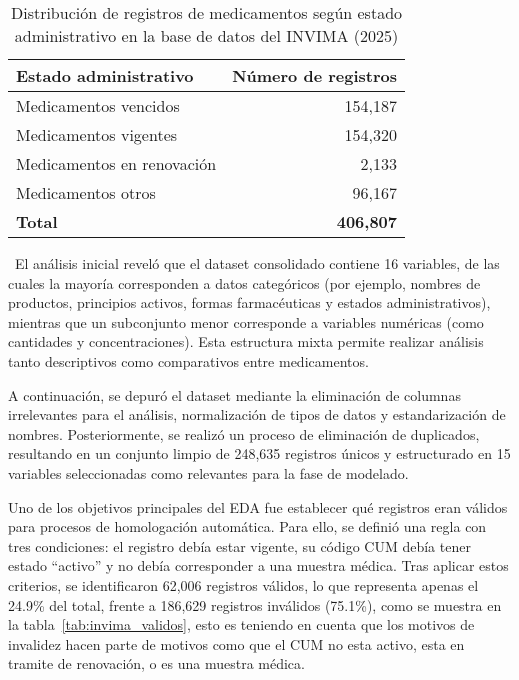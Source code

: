 \documentclass[conference]{IEEEtran}
\begin{document}
\begin{table}[htbp]
\caption{Distribución de registros de medicamentos según estado administrativo en la base de datos del INVIMA (2025) \cite{invima2025}}
\begin{center}
\begin{tabular}{|l|r|}
\hline
\textbf{Estado administrativo} & \textbf{Número de registros} \\
\hline
Medicamentos vencidos         & 154,187 \\
Medicamentos vigentes         & 154,320 \\
Medicamentos en renovación    & 2,133   \\
Medicamentos otros            & 96,167  \\
\hline
\textbf{Total} & \textbf{406,807} \\
\hline
\end{tabular}
\label{tab:invima_estados}
\end{center}
\end{table}

\
El análisis inicial reveló que el dataset consolidado contiene 16 variables, de las cuales la mayoría corresponden a datos categóricos (por ejemplo, nombres de productos, principios activos, formas farmacéuticas y estados administrativos), mientras que un subconjunto menor corresponde a variables numéricas (como cantidades y concentraciones). Esta estructura mixta permite realizar análisis tanto descriptivos como comparativos entre medicamentos.

A continuación, se depuró el dataset mediante la eliminación de columnas irrelevantes para el análisis, normalización de tipos de datos y estandarización de nombres. Posteriormente, se realizó un proceso de eliminación de duplicados, resultando en un conjunto limpio de 248,635 registros únicos y estructurado en 15 variables seleccionadas como relevantes para la fase de modelado.

Uno de los objetivos principales del EDA fue establecer qué registros eran válidos para procesos de homologación automática. Para ello, se definió una regla con tres condiciones: el registro debía estar vigente, su código CUM debía tener estado “activo” y no debía corresponder a una muestra médica. Tras aplicar estos criterios, se identificaron 62,006 registros válidos, lo que representa apenas el 24.9\% del total, frente a 186,629 registros inválidos (75.1\%), como se muestra en la tabla~\ref{tab:invima_validos}, esto es teniendo en cuenta que los motivos de invalidez hacen parte de motivos como que el CUM no esta activo, esta en tramite de renovación, o es una muestra médica.
\end{document}
